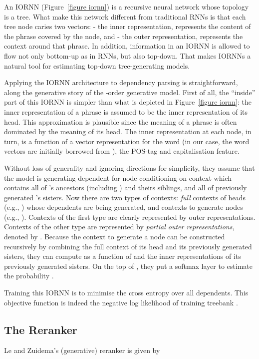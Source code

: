 \documentclass[11pt,letterpaper]{article}
\begin{document}
An IORNN (Figure~\ref{figure iornn}) is a recursive neural network 
whose topology is a tree. What make this network different from 
traditional RNNs \cite{socher_learning_2010} is that each tree node 
 caries two vectors:  - the inner 
representation, represents the content of the phrase covered 
by the node, and  - the outer representation, 
represents the context around that phrase. In addition, information 
in an IORNN is allowed to flow not only bottom-up as in RNNs, but 
also top-down. That makes IORNNs a natural tool for estimating 
top-down tree-generating models. 

Applying the IORNN architecture to dependency parsing is straightforward, 
along the generative story of the -order generative model. 
First of all, the ``inside'' part of this IORNN is simpler than 
what is depicted in Figure~\ref{figure iornn}: the inner representation 
of a phrase is assumed to be the inner representation of its head. 
This approximation is plausible since the meaning of a phrase is often 
dominated by the meaning of its head. The inner representation at 
each node, in turn, is a function of a vector 
representation for the word (in our case, the word vectors are initially
borrowed from ), the POS-tag and
capitalisation feature.

Without loss of generality and ignoring directions for simplicity, 
they assume that the model is generating 
dependent  for node  conditioning on context  
which contains all of 's ancestors (including ) and theirs 
siblings, and all of previously generated 's sisters. 
Now there are two types of contexts: \textit{full} contexts of heads (e.g., )
whose dependents are being generated, and contexts to generate nodes
(e.g., ). 
Contexts of the first type are clearly represented by outer 
representations. Contexts of the other type are represented by 
\textit{partial outer representations}, denoted by .
Because the context to generate a node can be constructed recursively by 
combining the full context of its head and its previously generated sisters, 
they can compute  as a function of  and 
the inner representations of its previously generated sisters. 
On the top of , they put a softmax layer to estimate 
the probability . 

Training this IORNN is to minimise the cross entropy over all dependents. 
This objective function is indeed the negative log likelihood  
of training treebank . 


\subsection{The Reranker}
\label{subsection reranker}
Le and Zuidema's (generative) reranker is given by 
\end{document}
